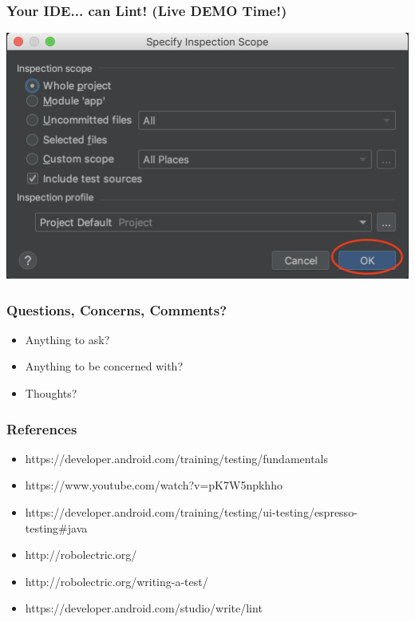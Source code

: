 \documentclass[10pt]{beamer}
\begin{document}
\begin{frame}
    \frametitle{Your IDE... can Lint! (Live DEMO Time!)}
    \center\includegraphics[scale=0.5]{lint_step2}
\end{frame}

\begin{frame}
    \frametitle{Questions, Concerns, Comments?}
    \begin{itemize}
        \small
        \item Anything to ask?
        \item Anything to be concerned with?
        \item Thoughts?
    \end{itemize}
\end{frame}

\begin{frame}
    \frametitle{References}
    \begin{itemize}
        \small
        \item https://developer.android.com/training/testing/fundamentals
        \item https://www.youtube.com/watch?v=pK7W5npkhho
        \item https://developer.android.com/training/testing/ui-testing/espresso-testing\#java
        \item http://robolectric.org/
        \item http://robolectric.org/writing-a-test/
        \item https://developer.android.com/studio/write/lint
    \end{itemize}
\end{frame}
\end{document}
